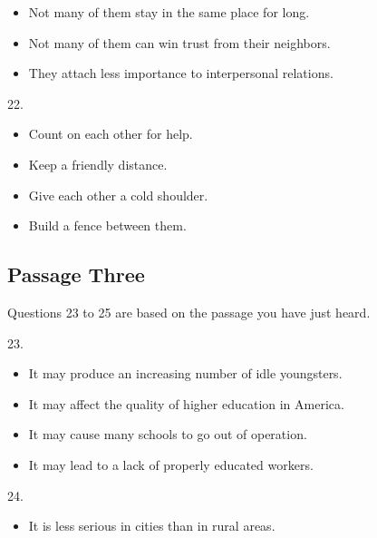 \documentclass[UTF8,11pt]{ctexart}
\begin{document}
\begin{itemize}[leftmargin=2em,itemsep=.2em,topsep=.4em]\item[B.] Not many of them stay in the same place for long.
\item[C.] Not many of them can win trust from their neighbors.
\item[D.] They attach less importance to interpersonal relations.
\end{itemize}

22.


\begin{itemize}[leftmargin=2em,itemsep=.2em,topsep=.4em]\item[A.] Count on each other for help.
\item[C.] Keep a friendly distance.
\end{itemize}

\begin{itemize}[leftmargin=2em,itemsep=.2em,topsep=.4em]\item[B.] Give each other a cold shoulder.
\item[D.] Build a fence between them.
\end{itemize}

\subsection*{Passage Three}


Questions 23 to 25 are based on the passage you have just heard.


23.


\begin{itemize}[leftmargin=2em,itemsep=.2em,topsep=.4em]\item[A.] It may produce an increasing number of idle youngsters.
\end{itemize}

\begin{itemize}[leftmargin=2em,itemsep=.2em,topsep=.4em]\item[B.] It may affect the quality of higher education in America.
\item[C.] It may cause many schools to go out of operation.
\item[D.] It may lead to a lack of properly educated workers.
\end{itemize}

24.


\begin{itemize}[leftmargin=2em,itemsep=.2em,topsep=.4em]\item[A.] It is less serious in cities than in rural areas.
\end{itemize}
\end{document}
